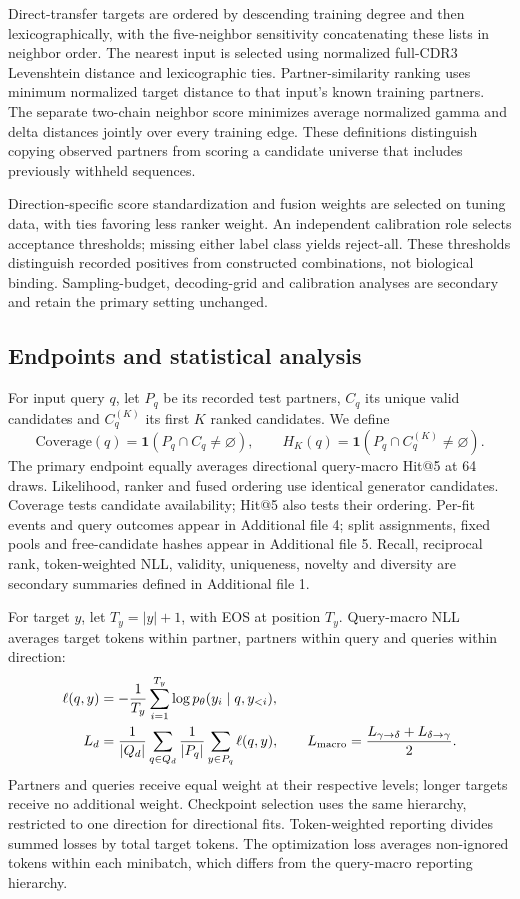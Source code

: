 \documentclass[a4paper,11pt]{article}
\begin{document}
Direct-transfer targets are ordered by descending training degree and then
lexicographically, with the five-neighbor sensitivity concatenating these
lists in neighbor order. The nearest input is selected using normalized
full-CDR3 Levenshtein distance and lexicographic ties. Partner-similarity
ranking uses minimum normalized target distance to that input's known
training partners. The separate two-chain neighbor score minimizes average
normalized gamma and delta distances jointly over every training edge.
These definitions distinguish copying observed partners from scoring a
candidate universe that includes previously withheld sequences.

Direction-specific score standardization and fusion weights are selected on
tuning data, with ties favoring less ranker weight. An independent calibration
role selects acceptance thresholds; missing either label class yields
reject-all. These thresholds distinguish recorded positives from constructed
combinations, not biological binding. Sampling-budget, decoding-grid and
calibration analyses are secondary and retain the primary setting unchanged.

\subsection{Endpoints and statistical analysis}
For input query $q$, let $P_q$ be its recorded test partners, $C_q$ its unique
valid candidates and $C_q^{(K)}$ its first $K$ ranked candidates. We define
\begin{equation}
\mathrm{Coverage}(q)=\mathbf{1}(P_q\cap C_q\ne\varnothing),\qquad
H_K(q)=\mathbf{1}(P_q\cap C_q^{(K)}\ne\varnothing).
\end{equation}
The primary endpoint equally averages directional query-macro Hit@5 at 64
draws. Likelihood, ranker and fused ordering use identical generator candidates.
Coverage tests candidate availability; Hit@5 also tests their ordering.
Per-fit events and query outcomes appear in Additional file 4; split
assignments, fixed pools and free-candidate hashes appear in Additional file 5.
Recall, reciprocal rank, token-weighted NLL, validity, uniqueness, novelty and
diversity are secondary summaries defined in Additional file 1.

For target $y$, let $T_y=|y|+1$, with EOS at position $T_y$. Query-macro NLL
averages target tokens within partner, partners within query and queries within
direction:
\begin{align}
\ell(q,y)&=-\frac{1}{T_y}\sum_{i=1}^{T_y}\log p_\theta(y_i\mid q,y_{<i}),\\
L_d&=\frac{1}{|Q_d|}\sum_{q\in Q_d}\frac{1}{|P_q|}
 \sum_{y\in P_q}\ell(q,y),\qquad
L_{\rm macro}=\frac{L_{\gamma\rightarrow\delta}+L_{\delta\rightarrow\gamma}}{2}.
\end{align}
Partners and queries receive equal weight at their respective levels;
longer targets receive no additional weight. Checkpoint selection uses the
same hierarchy, restricted to one direction for directional fits.
Token-weighted reporting divides summed losses by total target tokens.
The optimization loss averages non-ignored tokens within each minibatch,
which differs from the query-macro reporting hierarchy.
\end{document}
